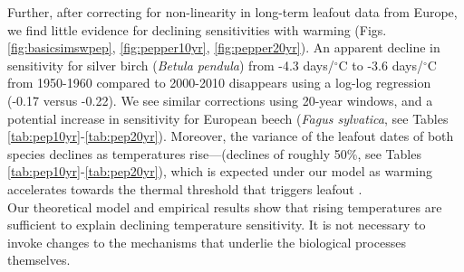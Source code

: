 \documentclass[11pt,letter]{article}
\begin{document}
Further, after correcting for non-linearity in long-term leafout data from Europe, we find little evidence for declining sensitivities with warming (Figs. \ref{fig:basicsimswpep}, \ref{fig:pepper10yr}, \ref{fig:pepper20yr}). An apparent decline in sensitivity for silver birch (\emph{Betula pendula}) from -4.3 days/$^{\circ}$C to -3.6 days/$^{\circ}$C from 1950-1960 compared to 2000-2010 disappears using a log-log regression (-0.17 versus -0.22). We see similar corrections using 20-year windows, and a potential increase in sensitivity for European beech (\emph{Fagus sylvatica}, see Tables \ref{tab:pep10yr}-\ref{tab:pep20yr}). Moreover, the variance of the leafout dates of both species declines as temperatures rise---(declines of roughly 50\%, see Tables \ref{tab:pep10yr}-\ref{tab:pep20yr}), which is expected under our model as warming accelerates towards the thermal threshold that triggers leafout \citep[and in contrast to predictions from changing mechanisms, see][]{ford2016}. \\

Our theoretical model and empirical results show that rising temperatures are sufficient to explain declining temperature sensitivity. It is not necessary to invoke changes to the mechanisms that underlie the biological processes themselves. \\

\end{document}
